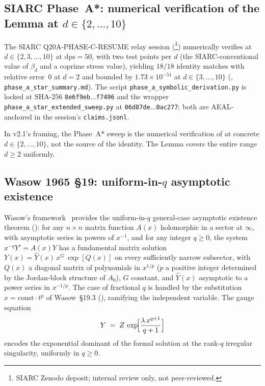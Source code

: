 \documentclass[11pt,reqno]{amsart}
\theoremstyle{plain}
\theoremstyle{definition}
\theoremstyle{remark}
\newcommand{\dps}{\mathrm{dps}}
\begin{document}
\subsection{SIARC Phase~A*: numerical verification of the Lemma at \texorpdfstring{$d \in \{2,\ldots,10\}$}{d in 2..10}}
\label{ssec:phase-a-star}

The SIARC Q20A-PHASE-C-RESUME relay session
(\cite{siarc_q20a_phase_c_resume}\footnote{SIARC Zenodo
deposit; internal review only, not peer-reviewed.})
numerically verifies  at
$d \in \{2, 3, \ldots, 10\}$ at $\dps = 50$, with two test
points per $d$ (the SIARC-conventional value of $\beta_d$
and a coprime stress value), yielding $18/18$ identity
matches with relative error~$0$ at $d = 2$ and bounded by
$1.73\times 10^{-51}$ at $d \in \{3,\dots,10\}$
(\cite[Phase~A* summary]{siarc_q20a_phase_c_resume},
\texttt{phase\_a\_star\_summary.md}). The script
\texttt{phase\_a\_symbolic\_derivation.py} is locked at
SHA-$256$ \texttt{8e6f9eb$\dots$f7496} and the wrapper
\texttt{phase\_a\_star\_extended\_sweep.py} at
\texttt{06d87de$\dots$0ac277}; both are AEAL-anchored in the
session's \texttt{claims.jsonl}.

In v2.1's framing, the Phase~A* sweep is the numerical
verification of  at concrete
$d \in \{2,\ldots,10\}$, not the source of the identity. The
Lemma covers the entire range $d \ge 2$ uniformly.

\subsection{Wasow 1965 \texorpdfstring{\S19}{S19}: uniform-in-$q$ asymptotic existence}
\label{ssec:wasow}

Wasow's framework~\cite{wasow1965asymptotic} provides the
uniform-in-$q$ general-case asymptotic existence theorem
(\cite[\S19, Thm.~19.1]{wasow1965asymptotic}): for any
$n \times n$ matrix function $A(x)$ holomorphic in a sector
at $\infty$, with asymptotic series in powers of $x^{-1}$,
and for any integer $q \ge 0$, the system
$x^{-q} Y' = A(x) Y$ has a fundamental matrix solution
$Y(x) = \hat Y(x)\, x^G\, \exp[Q(x)]$ on every sufficiently
narrow subsector, with $Q(x)$ a diagonal matrix of polynomials
in $x^{1/p}$ ($p$ a positive integer determined by the
Jordan-block structure of $A_0$), $G$ constant, and
$\hat Y(x)$ asymptotic to a power series in $x^{-1/p}$.
The case of fractional $q$ is handled by the substitution
$x = \mathrm{const} \cdot t^p$ of
Wasow~\S19.3 (\cite[\S19.3, eq.~(19.26)]{wasow1965asymptotic}),
ramifying the independent variable. The gauge equation
\cite[\S19.1, eq.~(19.3)]{wasow1965asymptotic}
\[
  Y \;=\; Z\,\exp\!\Bigl[\frac{\lambda\,x^{q+1}}{q+1}\Bigr]
\]
encodes the exponential dominant of the formal solution at
the rank-$q$ irregular singularity, uniformly in $q \ge 0$.
\end{document}
